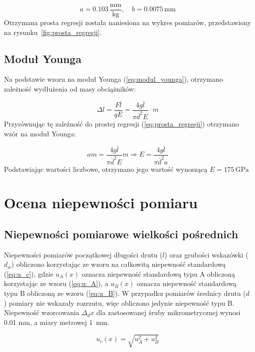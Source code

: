 \documentclass[a4paper,12pt]{article}
\begin{document}
\begin{equation}
a = 0.103\,\frac{\text{mm}}{\text{kg}}, \quad 
b = 0.0075\,\text{mm}
\end{equation}
Otrzymana prosta regresji została naniesiona na wykres pomiarów, przedstawiony na rysunku~\ref{fig:prosta_regresji}.

\subsection{Moduł Younga}

Na podstawie wzoru na moduł Younga (\ref{eq:modul_younga}), otrzymano zależność wydłużenia od masy obciążników:

\begin{equation}
\Delta l = \frac{F\bar{l}}{qE} = \frac{4g\bar{l}}{\pi\bar{d}^2 E}\cdot m
\end{equation}
Przyrównując tę zależność do prostej regresji (\ref{eq:prosta_regresji}) otrzymano wzór na moduł Younga:

\begin{equation}
    am = \frac{4g\bar{l}}{\pi\bar{d}^2 E}m
    \Rightarrow
    E = \frac{4g\bar{l}}{\pi\bar{d}^2 a}
\end{equation}
Podstawiając wartości liczbowe, otrzymano jego wartość wynoszącą $E = 175\,\text{GPa}$

\section{Ocena niepewności pomiaru}


\subsection{Niepewności pomiarowe wielkości pośrednich}

Niepewności pomiarów początkowej długości drutu ($l$) oraz  grubości wskazówki ($d_w$) obliczono korzystając ze wzoru na całkowitą niepewność standardową (\ref{eq:u_c}), gdzie $u_A(x)$ oznacza niepewność standardową typu A obliczoną korzystając ze wzoru (\ref{eq:u_A}), a $u_B(x)$ oznacza niepewność standardową typu B obliczoną ze wzoru (\ref{eq:u_B}).
W przypadku pomiarów średnicy drutu ($d$) pomiary nie wskazały rozrzutu, więc obliczono jedynie niepewność typu B.
Niepewność wzorcowania \( \Delta_d x \) dla zastosowanej śruby mikrometrycznej wynosi 0.01 mm, a miary metrowej 1~mm.

\begin{equation}
\label{eq:u_c}
u_c(x) = \sqrt{u_A^2 + u_B^2}
\end{equation}
\end{document}
